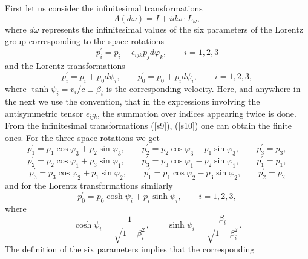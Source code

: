 \documentclass[a4paper,a4paper]{article}
\begin{document}
First let us consider the infinitesimal transformations 
\begin{equation}
\Lambda (d\omega )=I+id\omega \cdot L_{\omega },  \label{s8}
\end{equation}%
where $d\omega $ represents the infinitesimal values of the six parameters
of the Lorentz group corresponding to the space rotations 
\begin{equation}
p_{i}^{\prime }=p_{i}+\epsilon _{ijk}p_{j}d\varphi _{k},\qquad i=1,2,3
\label{s9}
\end{equation}%
and the Lorentz transformations 
\begin{equation}
p_{i}^{\prime }=p_{i}+p_{0}d\psi _{i},\qquad p_{0}^{\prime
}=p_{0}+p_{i}d\psi _{i},\qquad i=1,2,3,  \label{s10}
\end{equation}%
where $\tanh \psi _{i}=v_{i}/c\equiv \beta _{i}$ is the corresponding
velocity. Here, and anywhere in the next we use the convention, that in the
expressions involving the antisymmetric tensor $\epsilon _{ijk}$, the
summation over indices appearing twice is done. From the infinitesimal
transformations (\ref{s9}), (\ref{s10}) one can obtain the finite ones. For
the three space rotations we get 
\begin{equation}
p_{1}^{\prime }=p_{1}\cos \varphi _{3}+p_{2}\sin \varphi _{3},\qquad
p_{2}^{\prime }=p_{2}\cos \varphi _{3}-p_{1}\sin \varphi _{3},\qquad
p_{3}^{\prime }=p_{3},  \label{sa10}
\end{equation}%
\begin{equation}
p_{2}^{\prime }=p_{2}\cos \varphi _{1}+p_{3}\sin \varphi _{1},\qquad
p_{3}^{\prime }=p_{3}\cos \varphi _{1}-p_{2}\sin \varphi _{1},\qquad
p_{1}^{\prime }=p_{1},  \label{sb10}
\end{equation}%
\begin{equation}
p_{3}^{\prime }=p_{3}\cos \varphi _{2}+p_{1}\sin \varphi _{2},\qquad
p_{1}^{\prime }=p_{1}\cos \varphi _{2}-p_{3}\sin \varphi _{2},\qquad
p_{2}^{\prime }=p_{2}  \label{sc10}
\end{equation}%
and for the Lorentz transformations similarly 
\begin{equation}
p_{0}^{\prime }=p_{0}\cosh \psi _{i}+p_{i}\sinh \psi _{i},\qquad i=1,2,3,
\label{sd10}
\end{equation}%
where 
\begin{equation}
\cosh \psi _{i}=\frac{1}{\sqrt{1-\beta _{i}^{2}}},\qquad \sinh \psi _{i}=%
\frac{\beta _{i}}{\sqrt{1-\beta _{i}^{2}}}.  \label{se10}
\end{equation}%
The definition of the six parameters implies that the corresponding
\end{document}
